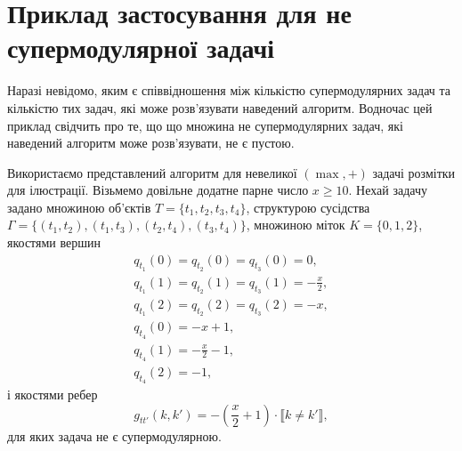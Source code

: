 \section{Приклад застосування для не супермодулярної задачі}
Наразі невідомо, яким є співвідношення між кількістю супермодулярних задач та кількістю тих задач, 
які може розв'язувати наведений алгоритм. Водночас цей приклад свідчить про те, що
що множина не супермодулярних задач, які наведений
алгоритм може розв’язувати, не є пустою.


Використаємо представлений алгоритм для невеликої $(\max,+)$ задачі розмітки для ілюстрації.
Візьмемо довільне додатне парне число $x\geq 10$. Нехай задачу задано множиною
об'єктів $T=\{t_1,t_2,t_3,t_4\}$, структурою сусідства \\$\Gamma=\{(t_1,t_2),(t_1,t_3),(t_2,t_4),(t_3,t_4)\}$, 
множиною міток $K=\{0,1,2\}$, якостями вершин 
\begin{equation*}
    \begin{aligned}
       q_{t_1}(0)=q_{t_2}(0)=q_{t_3}(0)=0,\\
       q_{t_1}(1)=q_{t_2}(1)=q_{t_3}(1)=-\frac{x}{2},\\
       q_{t_1}(2)=q_{t_2}(2)=q_{t_3}(2)=-x,\\
       q_{t_4}(0)=-x+1,\\
       q_{t_4}(1)=-\frac{x}{2}-1,\\
       q_{t_4}(2)=-1,
    \end{aligned}
\end{equation*}
і якостями ребер 
\begin{equation*}
    g_{tt'}(k,k')=-\left(\frac{x}{2}+1\right)\cdot\llbracket k\neq k'\rrbracket,
\end{equation*}
для яких задача не є супермодулярною.

